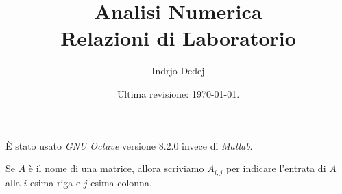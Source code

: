 


\title{Analisi Numerica \\ Relazioni di Laboratorio}
\author{Indrjo Dedej}
\date{Ultima revisione: \today{}.}



\maketitle

\tableofcontents

\begin{nota}
È stato usato {\em GNU Octave} versione 8.2.0 invece di {\em Matlab}.
\end{nota}

\begin{nota}
Se \(A\) è il nome di una matrice, allora scriviamo \(A_{i,j}\) per indicare l'entrata di \(A\) alla \(i\)-esima riga e \(j\)-esima colonna.
\end{nota}






